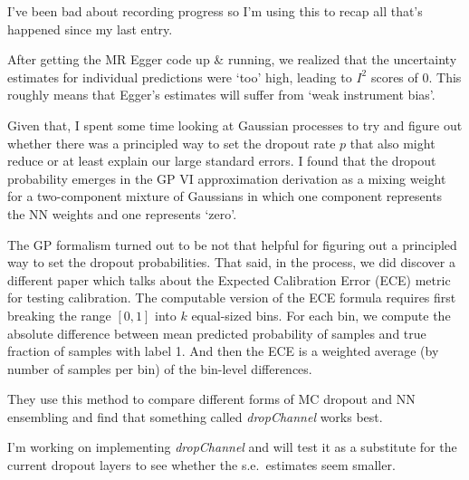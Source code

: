 \begin{Minutes}{}
\maketitle
{}
I've been bad about recording progress so I'm using this to recap all that's happened since my last entry.

After getting the MR Egger code up \& running, we realized that the uncertainty estimates for individual predictions were `too' high, leading to \( I^2 \) scores of 0. This roughly means that Egger's estimates will suffer from `weak instrument bias'.

Given that, I spent some time looking at Gaussian processes to try and figure out whether there was a principled way to set the dropout rate \( p \) that also might reduce or at least explain our large standard errors. I found that the dropout probability emerges in the GP VI approximation derivation as a mixing weight for a two-component mixture of Gaussians in which one component represents the NN weights and one represents `zero'.

The GP formalism turned out to be not that helpful for figuring out a principled way to set the dropout probabilities. That said, in the process, we did discover a different paper which talks about the Expected Calibration Error (ECE) metric for testing calibration. The computable version of the ECE formula requires first breaking the range \( [0, 1] \) into \( k \) equal-sized bins. For each bin, we compute the absolute difference between mean predicted probability of samples and true fraction of samples with label 1. And then the ECE is a weighted average (by number of samples per bin) of the bin-level differences.

They use this method to compare different forms of MC dropout and NN ensembling and find that something called \textit{dropChannel} works best.

I'm working on implementing \textit{dropChannel} and will test it as a substitute for the current dropout layers to see whether the s.e.\ estimates seem smaller.

\end{Minutes}
